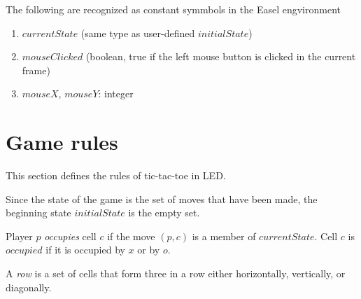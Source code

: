 \documentclass{led_doc}
\begin{document}
\begin{ledCmnt}
The following are recognized as constant symmbols in the Easel engvironment
\begin{enumerate}
\item $currentState$ (same type as user-defined $initialState$)
\item $mouseClicked$ (boolean, true if the left mouse button is clicked in the current frame)
\item $mouseX$, $mouseY$: integer
\end{enumerate}

\section{Game rules}


This section defines the rules of tic-tac-toe in LED.

Since the state of the game is the set of moves that have been made,
the beginning state $initialState$ is the empty set.
\end{ledCmnt}

\begin{ledDef}
\end{ledDef}

\begin{ledCmnt}
Player $p$ {\em occupies} cell $c$ if the move $(p,c)$ is a member of $currentState$.
Cell $c$ is $occupied$ if it is occupied by $x$ or by $o$.
\end{ledCmnt}

\begin{ledDef}
\end{ledDef}

\begin{ledDef}
\end{ledDef}

\begin{ledCmnt}
A {\em row} is a set of cells that form three in a row either horizontally, vertically, or diagonally.
\end{ledCmnt}

\begin{ledDef}
\end{ledDef}
\end{document}
